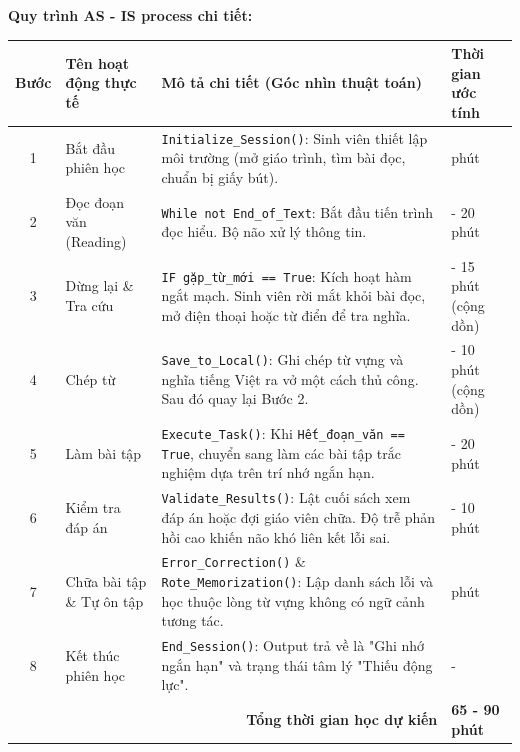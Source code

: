 \vspace{1em} %
\noindent \textbf{Quy trình AS - IS process chi tiết:} \smallskip

\begin{table}[H]
\centering
\small
\renewcommand{\arraystretch}{1.6}
\begin{tabularx}{\textwidth}{|c|>{\raggedright\arraybackslash}p{3cm}|X|>{\centering\arraybackslash}p{2.5cm}|}
\hline
\textbf{Bước} & \textbf{Tên hoạt động thực tế} & \textbf{Mô tả chi tiết (Góc nhìn thuật toán)} & \textbf{Thời gian ước tính} \\ \hline
1 & Bắt đầu phiên học & \texttt{Initialize\_Session()}: Sinh viên thiết lập môi trường (mở giáo trình, tìm bài đọc, chuẩn bị giấy bút). & 5 phút \\ \hline
2 & Đọc đoạn văn (Reading) & \texttt{While not End\_of\_Text}: Bắt đầu tiến trình đọc hiểu. Bộ não xử lý thông tin. & 15 - 20 phút \\ \hline
3 & Dừng lại \& Tra cứu & \texttt{IF gặp\_từ\_mới == True}: Kích hoạt hàm ngắt mạch. Sinh viên rời mắt khỏi bài đọc, mở điện thoại hoặc từ điển để tra nghĩa. & 10 - 15 phút (cộng dồn) \\ \hline
4 & Chép từ & \texttt{Save\_to\_Local()}: Ghi chép từ vựng và nghĩa tiếng Việt ra vở một cách thủ công. Sau đó quay lại Bước 2. & 5 - 10 phút (cộng dồn) \\ \hline
5 & Làm bài tập & \texttt{Execute\_Task()}: Khi \texttt{Hết\_đoạn\_văn == True}, chuyển sang làm các bài tập trắc nghiệm dựa trên trí nhớ ngắn hạn. & 15 - 20 phút \\ \hline
6 & Kiểm tra đáp án & \texttt{Validate\_Results()}: Lật cuối sách xem đáp án hoặc đợi giáo viên chữa. Độ trễ phản hồi cao khiến não khó liên kết lỗi sai. & 5 - 10 phút \\ \hline
7 & Chữa bài tập \& Tự ôn tập & \texttt{Error\_Correction()} \& \texttt{Rote\_Memorization()}: Lập danh sách lỗi và học thuộc lòng từ vựng không có ngữ cảnh tương tác. & 10 phút \\ \hline
8 & Kết thúc phiên học & \texttt{End\_Session()}: Output trả về là "Ghi nhớ ngắn hạn" và trạng thái tâm lý "Thiếu động lực". & - \\ \hline
\multicolumn{3}{|r|}{\textbf{Tổng thời gian học dự kiến}} & \textbf{65 - 90 phút} \\ \hline
\end{tabularx}
\end{table}

